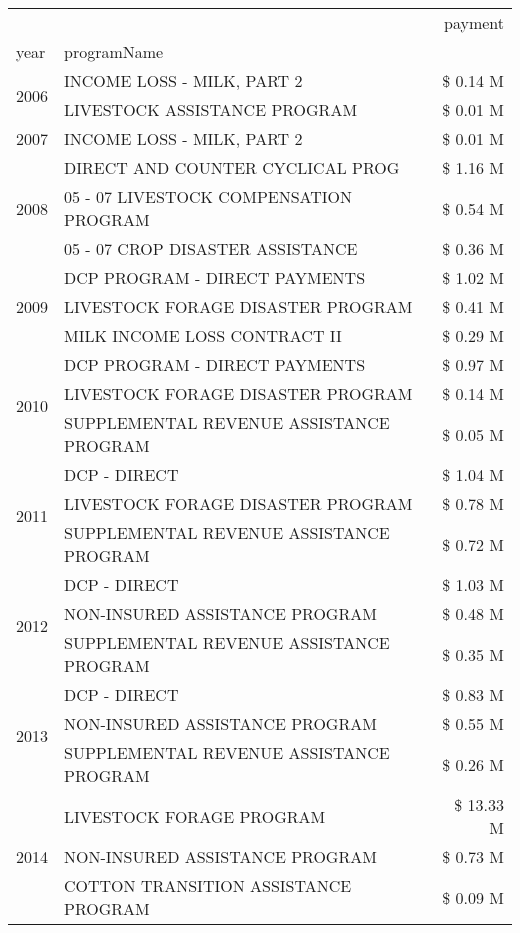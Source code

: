 \begin{tabular}{llr}
\toprule
 &  & payment \\
year & programName &  \\
\midrule
\multirow[t]{2}{*}{2006} & INCOME LOSS - MILK, PART 2 & \$ 0.14 M \\
 & LIVESTOCK ASSISTANCE PROGRAM & \$ 0.01 M \\
\cline{1-3}
2007 & INCOME LOSS - MILK, PART 2 & \$ 0.01 M \\
\cline{1-3}
\multirow[t]{3}{*}{2008} & DIRECT AND COUNTER CYCLICAL PROG & \$ 1.16 M \\
 & 05 - 07 LIVESTOCK COMPENSATION PROGRAM & \$ 0.54 M \\
 & 05 - 07 CROP DISASTER ASSISTANCE & \$ 0.36 M \\
\cline{1-3}
\multirow[t]{3}{*}{2009} & DCP PROGRAM - DIRECT PAYMENTS & \$ 1.02 M \\
 & LIVESTOCK FORAGE DISASTER  PROGRAM & \$ 0.41 M \\
 & MILK INCOME LOSS CONTRACT II & \$ 0.29 M \\
\cline{1-3}
\multirow[t]{3}{*}{2010} & DCP PROGRAM - DIRECT PAYMENTS & \$ 0.97 M \\
 & LIVESTOCK FORAGE DISASTER  PROGRAM & \$ 0.14 M \\
 & SUPPLEMENTAL REVENUE ASSISTANCE PROGRAM & \$ 0.05 M \\
\cline{1-3}
\multirow[t]{3}{*}{2011} & DCP - DIRECT & \$ 1.04 M \\
 & LIVESTOCK FORAGE DISASTER PROGRAM & \$ 0.78 M \\
 & SUPPLEMENTAL REVENUE ASSISTANCE PROGRAM & \$ 0.72 M \\
\cline{1-3}
\multirow[t]{3}{*}{2012} & DCP - DIRECT & \$ 1.03 M \\
 & NON-INSURED ASSISTANCE PROGRAM & \$ 0.48 M \\
 & SUPPLEMENTAL REVENUE ASSISTANCE PROGRAM & \$ 0.35 M \\
\cline{1-3}
\multirow[t]{3}{*}{2013} & DCP - DIRECT & \$ 0.83 M \\
 & NON-INSURED ASSISTANCE PROGRAM & \$ 0.55 M \\
 & SUPPLEMENTAL REVENUE ASSISTANCE PROGRAM & \$ 0.26 M \\
\cline{1-3}
\multirow[t]{3}{*}{2014} & LIVESTOCK FORAGE PROGRAM & \$ 13.33 M \\
 & NON-INSURED ASSISTANCE PROGRAM & \$ 0.73 M \\
 & COTTON TRANSITION ASSISTANCE PROGRAM & \$ 0.09 M \\

\end{tabular}
